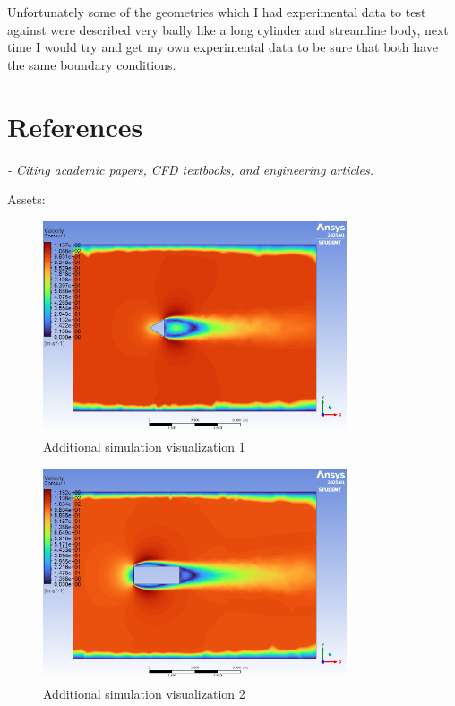 \documentclass[12pt,a4paper]{article}
\begin{document}
Unfortunately some of the geometries which I had experimental data to test against were described very badly like a long cylinder and streamline body, next time I would try and get my own experimental data to be sure that both have the same boundary conditions.

\section{References}

\textit{- Citing academic papers, CFD textbooks, and engineering articles.}

Assets:

\begin{figure}[H]
\centering
\includegraphics[width=0.8\textwidth]{image3.png}
\caption{Additional simulation visualization 1}
\label{fig:asset1}
\end{figure}

\begin{figure}[H]
\centering
\includegraphics[width=0.8\textwidth]{image10.png}
\caption{Additional simulation visualization 2}
\label{fig:asset2}
\end{figure}
\end{document}

